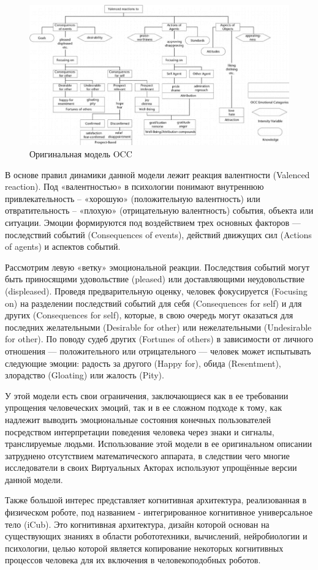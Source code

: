 \begin{figure}[h]
\includegraphics[width=0.75\columnwidth]{./img/ris3.png}
\centering
\caption{Оригинальная модель OCC}
\label{pic:ris3}
\end{figure}
В основе правил динамики данной модели лежит реакция валентности (Valenced reaction). 
Под «валентностью» в психологии понимают внутреннюю привлекательность – «хорошую» 
(положительную валентность) или отвратительность – «плохую» (отрицательную валентность) 
события, объекта или ситуации. Эмоции формируются под воздействием трех основных факторов — 
последствий событий (Consequences of events), действий движущих сил (Actions of agents) и аспектов событий.

Рассмотрим левую «ветку» эмоциональной реакции. Последствия событий могут быть приносящими 
удовольствие (pleased) или доставляющими неудовольствие (displeased). Проведя предварительную 
оценку, человек фокусируется (Focusing on) на разделении последствий событий для себя 
(Consequences for self) и для других (Consequences for self), которые, в свою очередь могут 
оказаться для последних желательными (Desirable for other) или нежелательными (Undesirable for other). 
По поводу судеб других (Fortunes of others) в зависимости от личного отношения — положительного или 
отрицательного — человек может испытывать следующие эмоции: радость за другого (Happy for), 
обида (Resentment), злорадство (Gloating) или жалость (Pity).

У этой модели есть свои ограничения, заключающиеся как в ее требовании упрощения человеческих эмоций,
 так и в ее сложном подходе к тому, как надлежит выводить эмоциональные состояния конечных пользователей 
 посредством интерпретации поведения человека через знаки и сигналы, транслируемые людьми. Использование 
 этой модели в ее оригинальном описании затруднено отсутствием математического аппарата, в следствии чего 
 многие исследователи в своих Виртуальных Акторах используют упрощённые версии данной модели.

Также большой интерес представляет когнитивная архитектура, реализованная в физическом роботе, 
под названием - интегрированное когнитивное универсальное тело (iCub). Это когнитивная архитектура,  
дизайн которой  основан на  существующих знаниях в области робототехники, вычислений, нейробиологии и 
психологии, целью которой является копирование некоторых когнитивных процессов человека для их включения 
в человекоподобных роботов.


